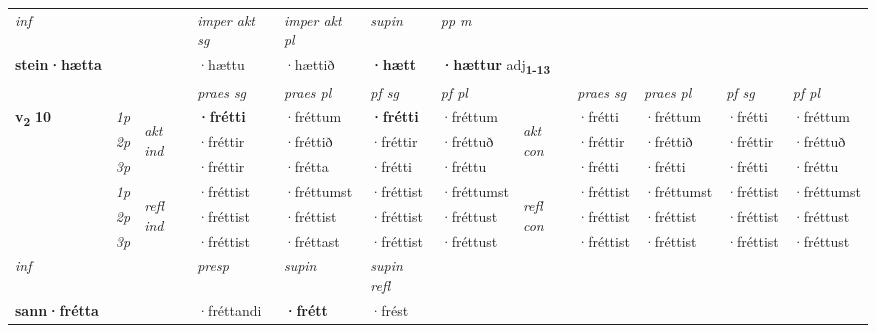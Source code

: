 \begin{longtable}[l]{X>{\footnotesize\itshape}llXXXXlXXXX}
   {\textit{inf}} & &  & \textit{imper akt sg} & \textit{imper akt pl}    & \textit{supin}  & \textit{pp m} \\*
  {\textbf{stein\allowbreak ·hætta}} & && ·hættu  & ·hættið    &  \textbf{·hætt}  & \multicolumn{2}{l}{\textbf{·hættur} adj\textbf{\textsubscript{1-13}}} \\*

\midrule

 & &   & \textit{praes sg}  & \textit{praes pl}    & \textit{ pf sg} & \textit{pf pl} & & \textit{praes sg}  & \textit{praes pl}    & \textit{pf sg} & \textit{pf pl }  \\ \cmidrule{4-7} \cmidrule{9-12}
 \multirow{2}{*}{{{\textbf{v{\textsubscript{2}}} \Large{\textbf{10}}}}}  & 1p & \multirow{3}{*}{\begin{turn}{90}\textit{akt ind}\end{turn}} & \textbf{·frétti} & ·fréttum & \textbf{·frétti} & ·fréttum & \multirow{3}{*}{\begin{turn}{90}\textit{akt con}\end{turn}} &·frétti & ·fréttum & ·frétti & ·fréttum\\*
 & 2p &  &  ·fréttir  & ·fréttið & ·fréttir & ·fréttuð & & ·fréttir & ·fréttið & ·fréttir & ·fréttuð \\*
 & 3p &  & ·fréttir & ·frétta & ·frétti & ·fréttu & & ·frétti & ·frétti& ·frétti & ·fréttu \\*
\cmidrule{4-7} \cmidrule{9-12}
 & 1p & \multirow{3}{*}{\begin{turn}{90}\textit{refl ind}\end{turn}}  & ·fréttist & ·fréttumst & ·fréttist & ·fréttumst & \multirow{3}{*}{\begin{turn}{90}\textit{refl con}\end{turn}}  &·fréttist & ·fréttumst & ·fréttist & ·fréttumst \\*
 & 2p &  & ·fréttist & ·fréttist & ·fréttist & ·fréttust & &·fréttist & ·fréttist & ·fréttist & ·fréttust \\*
 & 3p  & & ·fréttist & ·fréttast & ·fréttist & ·fréttust & & ·fréttist & ·fréttist& ·fréttist & ·fréttust \\*
\cmidrule{4-7} \cmidrule{9-12}

   {\textit{inf}} & &     & \textit{presp} & \textit{supin} & \textit{supin refl}  \\*
  {\textbf{sann\allowbreak ·frétta}} & &     & ·fréttandi &  \textbf{·frétt} & ·frést  \\*


\end{longtable}
